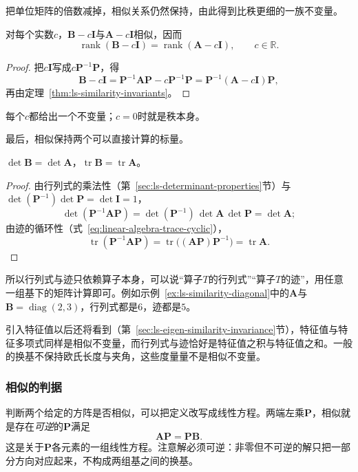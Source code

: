 把单位矩阵的倍数减掉，相似关系仍然保持，由此得到比秩更细的一族不变量。
\begin{theorem}[移位后的秩]
\label{thm:ls-similarity-shifted-rank}
对每个实数$c$，$\bm B-c\bm I$与$\bm A-c\bm I$相似，因而
\begin{equation}
\operatorname{rank}(\bm B-c\bm I)=\operatorname{rank}(\bm A-c\bm I),\qquad c\in\mathbb R.
\label{eq:ls-similarity-shifted-rank}
\end{equation}
\end{theorem}
\begin{proof}
把$c\bm I$写成$c\bm P^{-1}\bm P$，得
\[
 \bm B-c\bm I=\bm P^{-1}\bm A\bm P-c\bm P^{-1}\bm P=\bm P^{-1}(\bm A-c\bm I)\bm P,
\]
再由定理~\ref{thm:ls-similarity-invariants}。
\end{proof}
每个$c$都给出一个不变量；$c=0$时就是秩本身。

最后，相似保持两个可以直接计算的标量。
\begin{theorem}[行列式与迹不变]
\label{thm:ls-similarity-det-trace}
$\det\bm B=\det\bm A$，$\operatorname{tr}\bm B=\operatorname{tr}\bm A$。
\end{theorem}
\begin{proof}
由行列式的乘法性（第~\ref{sec:ls-determinant-properties}节）与$\det(\bm P^{-1})\det\bm P=\det\bm I=1$，
\[
 \det(\bm P^{-1}\bm A\bm P)=\det(\bm P^{-1})\,\det\bm A\,\det\bm P=\det\bm A;
\]
由迹的循环性（式~\eqref{eq:linear-algebra-trace-cyclic}），
\[
 \operatorname{tr}(\bm P^{-1}\bm A\bm P)=\operatorname{tr}\bigl((\bm A\bm P)\bm P^{-1}\bigr)=\operatorname{tr}\bm A.
\]
\end{proof}
所以行列式与迹只依赖算子本身，可以说“算子$T$的行列式”“算子$T$的迹”，用任意一组基下的矩阵计算即可。例如示例~\ref{ex:ls-similarity-diagonal}中的$\bm A$与$\bm B=\operatorname{diag}(2,3)$，行列式都是$6$，迹都是$5$。

引入特征值以后还将看到（第~\ref{sec:ls-eigen-similarity-invariance}节），特征值与特征多项式同样是相似不变量，而行列式与迹恰好是特征值之积与特征值之和。一般的换基不保持欧氏长度与夹角，这些度量量不是相似不变量。

\subsubsection{相似的判据}
\label{sec:ls-similarity-conditions}
判断两个给定的方阵是否相似，可以把定义改写成线性方程。两端左乘$\bm P$，相似就是存在\emph{可逆}的$\bm P$满足
\begin{equation}
 \bm A\bm P=\bm P\bm B.
 \label{eq:ls-similarity-equation}
\end{equation}
这是关于$\bm P$各元素的一组线性方程。注意解必须可逆：非零但不可逆的解只把一部分方向对应起来，不构成两组基之间的换基。

